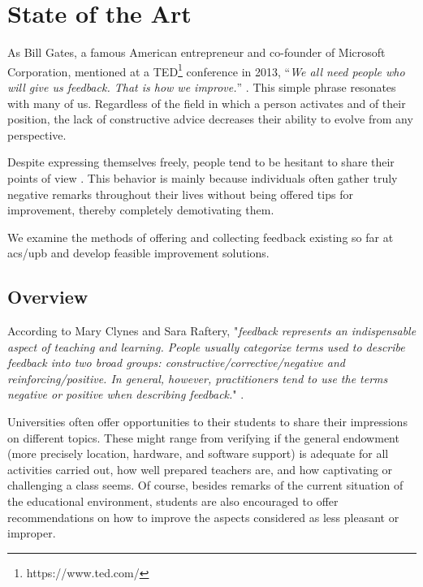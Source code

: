 \chapter{State of the Art} \label{chapter2}
    
    As Bill Gates, a famous American entrepreneur and co-founder of Microsoft Corporation, mentioned at a TED\footnote{https://www.ted.com/} conference in 2013, “\textit{We all need people who will give us feedback. That is how we improve.}” \cite{gates2013ted}. This simple phrase resonates with many of us. Regardless of the field in which a person activates and of their position, the lack of constructive advice decreases their ability to evolve from any perspective. 
    
    Despite expressing themselves freely, people tend to be hesitant to share their points of view \cite{hasan2012}. This behavior is mainly because individuals often gather truly negative remarks throughout their lives without being offered tips for improvement, thereby completely demotivating them. \cite{anna2011rowe}
    
    We examine the methods of offering and collecting feedback existing so far at \acrshort{acs}/\acrshort{upb} and develop feasible improvement solutions.

\section{Overview} \label{2:overview}

    According to Mary Clynes and Sara Raftery, "\textit{feedback represents an indispensable aspect of teaching and learning. People usually categorize terms used to describe feedback into two broad groups: constructive\slash corrective\slash negative and reinforcing\slash positive. In general, however, practitioners tend to use the terms negative or positive when describing feedback.}" \cite{mary2008sara}.
    
	Universities often offer opportunities to their students to share their impressions on different topics. These might range from verifying if the general endowment (more precisely location, hardware, and software support) is adequate for all activities carried out, how well prepared teachers are, and how captivating or challenging a class seems. Of course, besides remarks of the current situation of the educational environment, students are also encouraged to offer recommendations on how to improve the aspects considered as less pleasant or improper.
	
